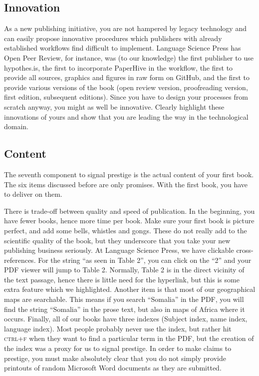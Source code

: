 \documentclass[nonflat,modfonts,output=book] {langsci/langscibook}
\begin{document}
\subsection{Innovation}
As a new publishing initiative, you are not hampered by legacy technology and can easily propose innovative procedures which publishers with already established workflows find difficult to implement. Language Science Press has Open Peer Review, for instance, was (to our knowledge) the first publisher to use hypothes.is, the first to incorporate PaperHive in the workflow, the first to provide all sources, graphics and figures in raw form on GitHub, and the first to provide various versions of the book (open review version, proofreading version, first edition, subsequent editions). Since you have to design your processes from scratch anyway, you might as well be innovative. Clearly highlight these innovations of yours and show that you are leading the way in the technological domain. 

 

\subsection{Content}
The seventh component to signal prestige is the actual content of your first book. The six items discussed before are only promises. With the first book, you have to deliver on them. 

There is trade-off between quality and speed of publication. In the beginning, you have fewer books, hence more time per book. Make sure your first book is picture perfect, and add some bells, whistles and gongs. These do not really add to the scientific quality of the book, but they underscore that you take your new publishing business seriously. At Language Science Press, we have clickable cross-references. For the string ``as seen in Table 2'', you can click on the ``2'' and your PDF viewer will jump to Table 2. Normally, Table 2 is in the direct vicinity of the text passage, hence there is little need for the hyperlink, but this is some extra feature which we highlighted. Another item is that most of our geographical maps are searchable. This means if you search ``Somalia'' in the PDF, you will find the string ``Somalia'' in the prose text, but also in maps of Africa where it occurs. Finally, all of our books have three indexes (Subject index, name index, language index). Most people probably never use the index,  but rather hit \textsc{ctrl+f} when they want to find a particular term in the PDF, but the creation of the index was a proxy for us to signal prestige. In order to make claims to prestige, you must make absolutely clear that you do not simply provide printouts of random Microsoft Word documents as they are submitted. 
\end{document}
